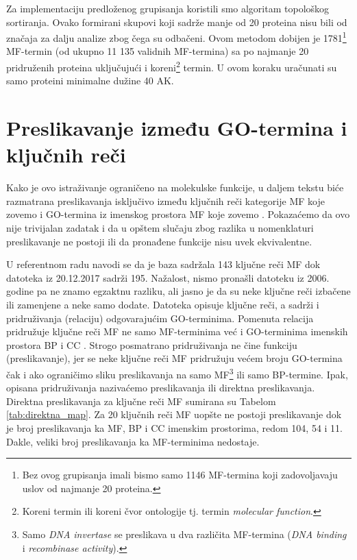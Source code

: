 Za implementaciju predloženog grupisanja koristili smo algoritam topološkog
sortiranja. Ovako formirani skupovi koji sadrže manje od 20 proteina nisu bili
od značaja za dalju analize zbog čega su odbačeni.
Ovom metodom dobijen je 1781\footnote{Bez ovog grupisanja imali bismo samo 1146
MF-termina  koji zadovoljavaju uslov od najmanje 20 proteina.} MF-termin (od ukupno
11 135 validnih MF-termina) sa po najmanje 20 pridruženih proteina uključujući i
koreni\footnote{Koreni termin ili koreni čvor ontologije tj.  termin
\textit{molecular function}.} termin. U ovom koraku uračunati su samo proteini
minimalne dužine 40 AK.

\section{Preslikavanje između GO-termina i ključnih reči}
\label{kw2go_mapiranje}

Kako je ovo istraživanje ograničeno na molekulske funkcije, u daljem tekstu
biće razmatrana preslikavanja isključivo između ključnih reči kategorije MF koje
zovemo  i GO-termina iz imenskog prostora MF koje zovemo
. Pokazaćemo da ovo nije trivijalan zadatak i da u opštem
slučaju zbog razlika u nomenklaturi preslikavanje ne postoji ili da pronađene
funkcije nisu uvek ekvivalentne.

U referentnom radu navodi se da je baza \swissprot sadržala 143 ključne reči MF
dok  datoteka  \cite{keywlist_txt} iz 20.12.2017 sadrži 195.
Nažalost, nismo pronašli   datoteku iz 2006. godine pa ne
znamo egzaktnu razliku, ali jasno je da su neke ključne reči
izbačene ili zamenjene a neke samo dodate. Datoteka  opisuje
ključne reči, a sadrži i pridruživanja (relaciju) odgovarajućim GO-terminima.
Pomenuta relacija pridružuje ključne reči MF ne samo MF-terminima već i
GO-terminima imenskih prostora BP i CC . Strogo posmatrano pridruživanja ne
čine funkciju (preslikavanje), jer se neke ključne reči MF pridružuju većem
broju GO-termina čak i ako ograničimo sliku preslikavanja na samo
MF\footnote{Samo \textit{DNA invertase} se preslikava u dva različita
MF-termina (\textit{DNA binding} i \textit{recombinase activity}).} ili samo
BP-termine.  Ipak, opisana pridruživanja nazivaćemo preslikavanja ili direktna
preslikavanja. Direktna preslikavanja za ključne reči MF sumirana su Tabelom
\ref{tab:direktna_map}.  Za 20 ključnih reči MF uopšte ne postoji preslikavanje
dok je broj preslikavanja ka MF, BP i CC imenskim prostorima, redom 104, 54 i
11. Dakle, veliki broj preslikavanja ka MF-terminima nedostaje.

